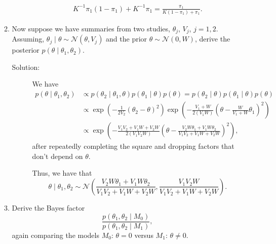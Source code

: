 \documentclass[letterpaper,11pt]{article}
\begin{document}
\begin{enumerate}
\begin{enumerate}
\begin{description}
\begin{align*}
          {K^{-1}\pi_1}
          {\left(1 - \pi_1\right) + K^{-1}\pi_1}
          = \frac
          {\pi_1}{K\left(1 - \pi_1\right) + \pi_1}.
      \end{align*}
    \end{description}
  \item Now suppose we have summaries from two studies, $\theta_j$, $V_j$,
    $j = 1,2$. Assuming,
    $\theta_j \mid \theta \sim \mathcal{N}\left(\theta, V_j\right)$ and the
    prior $\theta \sim \mathcal{N}\left(0,W\right)$, derive the posterior
    $p\left(\theta \mid \theta_1,\theta_2\right)$.
    \begin{description}
    \item[Solution:] We have
      \begin{align*}
        p\left(\theta \mid \theta_1,\theta_2\right)
        &\propto
          p\left(\theta_2 \mid \theta_1, \theta \right)
          p\left(\theta_1 \mid \theta \right)p\left(\theta\right)
          =
          p\left(\theta_2 \mid \theta \right)
          p\left(\theta_1 \mid \theta \right)p\left(\theta\right) \\
        &\propto
          \exp\left(
          -\frac{1}{2V_2}
          \left(\theta_2 - \theta\right)^2
          \right)
          \exp\left(
          -\frac{V_1 + W}{2\left(V_1W\right)}
          \left(\theta - \frac{W}{V_1+W}\theta_1\right)^2
          \right) \\
        &\propto
          \exp\left(
          -\frac{V_1V_2 + V_1W + V_2W}{2\left(V_1V_2W\right)}
          \left(
          \theta - \frac{V_2W\theta_1 + V_1W\theta_2}{V_1V_2 + V_1W + V_2W}
          \right)^2
          \right),
      \end{align*}
      after repeatedly completing the square and dropping factors that don't
      depend on $\theta$.

      Thus, we have that
      \begin{equation}
        \theta \mid \theta_1,\theta_2 \sim \mathcal{N}\left(
          \frac{V_2W\theta_1 + V_1W\theta_2}{V_1V_2 + V_1W + V_2W},
          \frac{V_1V_2W}{V_1V_2 + V_1W + V_2W}
        \right).
      \end{equation}
    \end{description}
  \item Derive the Bayes factor
    \begin{equation}
      \frac{p\left(\theta_1,\theta_2\mid M_0\right)}
      {p\left(\theta_1,\theta_2\mid M_1\right)},
    \end{equation}
    again comparing the models $M_0$: $\theta = 0$ versus $M_1$:
    $\theta \neq 0$.


\end{enumerate}
\end{enumerate}
\end{document}
